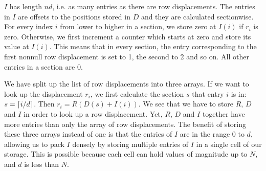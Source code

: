$I$ has length $nd$, i.e. as many entries as there are row displacements.
The entries in $I$ are offsets to the positions stored in $D$ and they are calculated sectionwise.
For every index $i$ from lower to higher in a section, we store zero at $I(i)$ if $r_i$ is zero.
Otherwise, we first increment a counter which starts at zero and store its value at $I(i)$.
This means that in every section, the entry corresponding to the first nonnull row displacement is set to 1, the second to 2 and so on.
All other entries in a section are 0.

We have split up the list of row displacements into three arrays.
If we want to look up the displacement $r_i$, we first calculate the section $s$ that entry $i$ is in: $s = \left\lceil i / d \right\rceil$.
Then $r_i = R(D(s) + I(i))$.
We see that we have to store $R$, $D$ and $I$ in order to look up a row displacement.
Yet, $R$, $D$ and $I$ together have more entries than only the array of row displacements.
The benefit of storing these three arrays instead of one is that the entries of $I$ are in the range 0 to $d$, allowing us to pack $I$ densely by storing multiple entries of $I$ in a single cell of our storage.
This is possible because each cell can hold values of magnitude up to $N$, and $d$ is less than $N$.